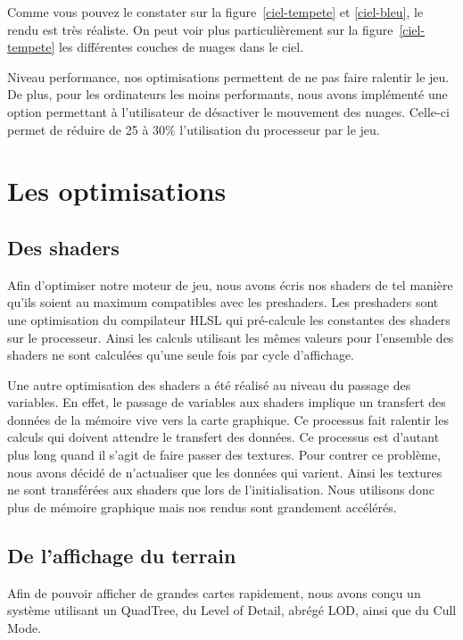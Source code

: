 \documentclass[11pt]{report}
\begin{document}
Comme vous pouvez le constater sur la figure~\ref{ciel-tempete} et \ref{ciel-bleu}, le rendu est très réaliste. On peut voir plus particulièrement sur la figure~\ref{ciel-tempete} les différentes couches de nuages dans le ciel.

Niveau performance, nos optimisations permettent de ne pas faire ralentir le jeu. De plus, pour les ordinateurs les moins performants, nous avons implémenté une option permettant à l'utilisateur de désactiver le mouvement des nuages. Celle-ci permet de réduire de 25 à 30\% l'utilisation du processeur par le jeu.

\section{Les optimisations}

\subsection{Des shaders}

Afin d’optimiser notre moteur de jeu, nous avons écris nos shaders de tel manière qu’ils soient au maximum compatibles avec les preshaders. Les preshaders sont une optimisation du compilateur HLSL qui pré-calcule les constantes des shaders sur le processeur. Ainsi les calculs utilisant les mêmes valeurs pour l’ensemble des shaders ne sont calculées qu’une seule fois par cycle d'affichage.

Une autre optimisation des shaders a été réalisé au niveau du passage des variables. En effet, le passage de variables aux shaders implique un transfert des données de la mémoire vive vers la carte graphique. Ce processus fait ralentir les calculs qui doivent attendre le transfert des données. Ce processus est d’autant plus long quand il s’agit de faire passer des textures. Pour contrer ce problème, nous avons décidé de n’actualiser que les données qui varient. Ainsi les textures ne sont transférées aux shaders que lors de l’initialisation. Nous utilisons donc plus de mémoire graphique mais nos rendus sont grandement accélérés.

\subsection{De l'affichage du terrain}

Afin de pouvoir afficher de grandes cartes rapidement, nous avons conçu un système utilisant un QuadTree, du Level of Detail, abrégé LOD, ainsi que du Cull Mode.
\end{document}
